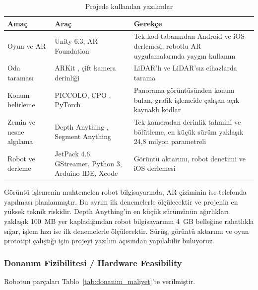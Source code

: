 \documentclass[11pt,a4paper]{article}
\begin{document}
\begin{table}[H]
\centering
\caption{Projede kullanılan yazılımlar}
\label{tab:yazilim_araclari}
\small
\begin{tabularx}{\linewidth}{>{\raggedright\arraybackslash}p{2.9cm} >{\raggedright\arraybackslash}p{5cm} >{\raggedright\arraybackslash}X}
\toprule
\textbf{Amaç} & \textbf{Araç} & \textbf{Gerekçe} \\
\midrule
Oyun ve AR & Unity 6.3, AR Foundation & Tek kod tabanından Android ve iOS derlemesi, robotlu AR uygulamalarında yaygın kullanım \cite{coronado2023integrating} \\
Oda taraması & ARKit \cite{apple2026arkit}, çift kamera derinliği \cite{zhang2020dunet} & LiDAR'lı ve LiDAR'sız cihazlarda tarama \\
Konum belirleme & PICCOLO, CPO \cite{kim2021piccolo,kim2022cpo}, PyTorch & Panorama görüntüsünden konum bulan, grafik işlemcide çalışan açık kaynaklı kodlar \\
Zemin ve nesne algılama & Depth Anything \cite{yang2024depthanything}, Segment Anything \cite{kirillov2023sam} & Tek kameradan derinlik tahmini ve bölütleme, en küçük sürüm yaklaşık 24,8 milyon parametreli \\
Robot ve derleme & JetPack 4.6, GStreamer, Python 3, Arduino IDE, Xcode & Görüntü aktarımı, robot denetimi ve iOS derlemesi \\
\bottomrule
\end{tabularx}
\end{table}

Görüntü işlemenin muhtemelen robot bilgisayarında, AR çiziminin ise telefonda yapılması planlanmıştır. Bu ayrım ilk denemelerle ölçülecektir ve projenin en yüksek teknik riskidir. Depth Anything'in en küçük sürümünün ağırlıkları yaklaşık 100~MB yer kapladığından robot bilgisayarının 4~GB belleğine rahatlıkla sığar, işlem hızı ise ilk denemelerle ölçülecektir. Sürüş, görüntü aktarımı ve oyun prototipi çalıştığı için projeyi yazılım açısından yapılabilir buluyoruz.

\newpage
\subsubsection{Donanım Fizibilitesi / Hardware Feasibility}
\label{subsubsec:donanim_fizibilitesi}
Robotun parçaları Tablo~\ref{tab:donanim_maliyet}'te verilmiştir.
\end{document}
